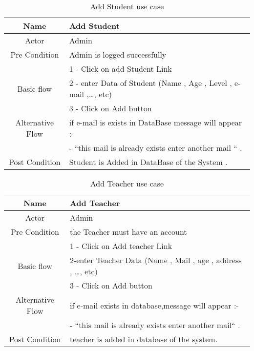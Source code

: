 \documentclass{article}
\begin{document}
	
	\begin{table}[!h]
		
		\caption{Add Student use case }
		\centering
		\label{Addfunction}
		
		\begin{tabular}{|c|l|}
			\hline
			Name                 & Add Student \\
			\hline
			Actor                & Admin  \\
			\hline
			Pre Condition        & Admin is logged successfully \\
			\hline
			                     & 1 - Click on add Student Link   \\
			Basic flow           & 2 - enter Data of Student (Name , Age , Level , e-mail ,\ldots , etc) \\
			                     & 3 - Click on Add button\\
			\hline
			
			Alternative Flow    & if e-mail is exists in DataBase message will appear  :-\\
			                    & - ``this mail is already exists enter another mail `` . \\
			\hline
			
			Post Condition      & Student is Added in DataBase of the System . \\
			
			\hline
			
		\end{tabular}
		
	\end{table}

	\begin{table}[!h]
		
		\caption{Add Teacher  use case }
		\centering
		\label{AddTeacherfunction}
		
		\begin{tabular}{|c|l|}
			\hline
			Name                 & Add Teacher \\
			\hline
			Actor                & Admin  \\
			\hline
			Pre Condition        & the Teacher must have an account \\
			\hline
			                &  1 - Click on Add teacher Link \\
			Basic flow      &  2-enter Teacher Data (Name , Mail , age , address , \ldots , etc) \\
			                & 3 - Click on Add button\\
			\hline
			
			Alternative Flow    & if e-mail exists in database,message will appear :-\\
		                    	& - ``this mail is already exists enter another mail`` . \\
			\hline
			
			Post Condition      & teacher is added in database of the system. \\
			
			\hline
			
		\end{tabular}
		
	\end{table}
	
\end{document}
